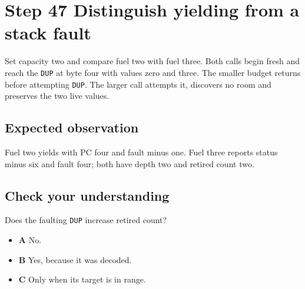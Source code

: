 \section{Step 47 Distinguish yielding from a stack fault}\label{vm-s47}

Set capacity two and compare fuel two with fuel three. Both calls begin fresh and reach the \texttt{DUP} at byte four with values zero and three. The smaller budget returns before attempting \texttt{DUP}. The larger call attempts it, discovers no room and preserves the two live values.

\subsection{Expected observation}
Fuel two yields with PC four and fault minus one. Fuel three reports status minus six and fault four; both have depth two and retired count two.

\subsection{Check your understanding}
Does the faulting \texttt{DUP} increase retired count?

\begin{itemize}
  \item \textbf{A} No.
  \item \textbf{B} Yes, because it was decoded.
  \item \textbf{C} Only when its target is in range.
\end{itemize}
